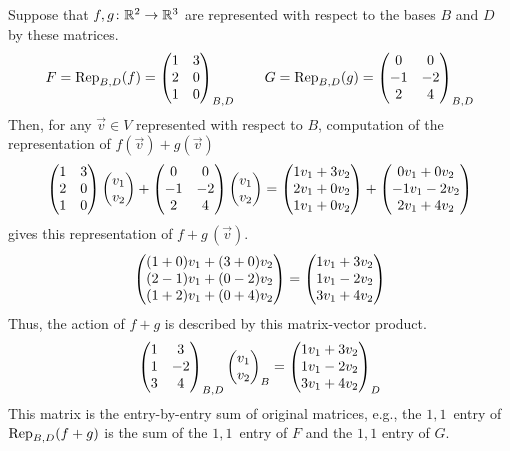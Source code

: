 \begin{example}
Suppose that \( \map{f,g}{\Re^2}{\Re^3} \) are represented 
with respect to the bases $B$ and $D$ by these matrices.
\begin{equation*}
  F=\rep{f}{B,D}=
    \begin{pmatrix}
       1  &3  \\
       2  &0  \\
       1  &0
    \end{pmatrix}_{B,D}
  \qquad
  G=\rep{g}{B,D}=
    \begin{pmatrix}
       0  &0  \\
      -1  &-2 \\
       2  &4
    \end{pmatrix}_{B,D}
\end{equation*}
Then, for any $\vec{v}\in V$ represented with respect to $B$, 
computation of the representation of $f(\vec{v})+g(\vec{v})$
\begin{equation*}
  \begin{pmatrix}
       1  &3  \\
       2  &0  \\
       1  &0
    \end{pmatrix}
  \colvec{v_1 \\ v_2}
  +
    \begin{pmatrix}
       0  &0  \\
      -1  &-2 \\
       2  &4
    \end{pmatrix}
    \colvec{v_1 \\ v_2}
  =\colvec{1v_1+3v_2 \\ 2v_1+0v_2 \\ 1v_1+0v_2}
  +\colvec{0v_1+0v_2 \\ -1v_1-2v_2 \\ 2v_1+4v_2}   
\end{equation*}
gives this representation of $f+g\,(\vec{v})$.
\begin{equation*}
  \colvec{(1+0)v_1+(3+0)v_2 \\ (2-1)v_1+(0-2)v_2 \\ (1+2)v_1+(0+4)v_2}
  =\colvec{1v_1+3v_2 \\ 1v_1-2v_2 \\ 3v_1+4v_2}
\end{equation*}
Thus, the action of $f+g$ is described by this matrix-vector product.
\begin{equation*}
  \begin{pmatrix}
       1  &3  \\
       1  &-2 \\
       3  &4
    \end{pmatrix}_{B,D}
  \colvec{v_1 \\ v_2}_B
  =\colvec{1v_1+3v_2 \\ 1v_1-2v_2 \\ 3v_1+4v_2}_D
\end{equation*}
This matrix is the entry-by-entry sum of original matrices,
e.g., the $1,1$~entry of $\rep{f+g}{B,D}$ is the sum of the $1,1$~entry of
$F$ and the $1,1$ entry of $G$.
\end{example}

